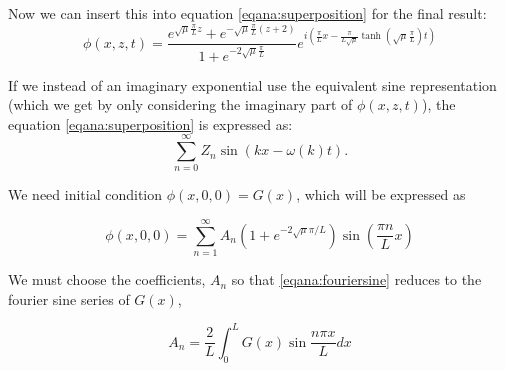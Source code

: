 \documentclass[11pt]{article}
\begin{document}
Now we can insert this into equation \eqref{eqana:superposition} for the final result:
\begin{equation*}
\phi(x,z,t) = \frac{ e^{ \sqrt{\mu} \frac{\pi }{L}z}  + e^{ -\sqrt{\mu}\frac{\pi }{L}(z+2)    }}{1 + e^{-2\sqrt{\mu}\frac{\pi }{L} }} e^{i \left( \frac{\pi }{L}x - \frac{\pi }{L\sqrt{\mu}} \tanh (\sqrt{\mu}\frac{\pi }{L})t \right)}
\end{equation*}




If we instead of an imaginary exponential use the equivalent sine representation (which we get by only considering the imaginary part of $\phi(x,z,t)$), the equation \eqref{eqana:superposition} is expressed as:
\begin{equation*}
\sum_{n=0}^\infty Z_n \sin \left(  kx-\omega(k)t  \right).
\end{equation*}

We need initial condition $\phi(x,0,0) = G(x)$, which will be expressed as

\begin{equation}
\label{eqana:fouriersine}
\phi(x,0,0) = \sum_{n=1}^\infty A_n \left( 1 + e^{-2\sqrt{\mu}\pi/L} \right) \sin \left( \frac{\pi n}{L}x \right)
\end{equation}

We must choose the coefficients, $A_n$ so that \eqref{eqana:fouriersine} reduces to the fourier sine series of $G(x)$,

\begin{equation*}
A_n = \frac{2}{L} \int_0^L G(x) \sin \frac{n \pi x}{L} d x
\end{equation*}
%
%
\end{document}
